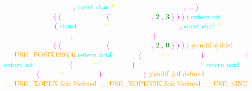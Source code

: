 \textcolor{white}{\_\_restrict} 
\textcolor{white}{\_\_obstack} 
\textcolor{magenta}{,} 
\textcolor{cyan}{const} 
\textcolor{cyan}{char} 
\textcolor{yellow}{*} 
\textcolor{white}{\_\_restrict} 
\textcolor{white}{\_\_format} 
\textcolor{magenta}{,} 
\textcolor{magenta}{...} 
\textcolor{magenta}{)} 
\textcolor{white}{\_\_THROWNL} 
\textcolor{white}{\_\_attribute\_\_} 
\textcolor{magenta}{(} 
\textcolor{magenta}{(} 
\textcolor{white}{\_\_format\_\_} 
\textcolor{magenta}{(} 
\textcolor{white}{\_\_printf\_\_} 
\textcolor{magenta}{,} 
\textcolor{green}{2} 
\textcolor{magenta}{,} 
\textcolor{green}{3} 
\textcolor{magenta}{)} 
\textcolor{magenta}{)} 
\textcolor{magenta}{)} 
\textcolor{magenta}{;} 
\textcolor{cyan}{extern} 
\textcolor{cyan}{int} 
\textcolor{white}{obstack\_vprintf} 
\textcolor{magenta}{(} 
\textcolor{cyan}{struct} 
\textcolor{white}{obstack} 
\textcolor{yellow}{*} 
\textcolor{white}{\_\_restrict} 
\textcolor{white}{\_\_obstack} 
\textcolor{magenta}{,} 
\textcolor{cyan}{const} 
\textcolor{cyan}{char} 
\textcolor{yellow}{*} 
\textcolor{white}{\_\_restrict} 
\textcolor{white}{\_\_format} 
\textcolor{magenta}{,} 
\textcolor{white}{\_\_gnuc\_va\_list} 
\textcolor{white}{\_\_args} 
\textcolor{magenta}{)} 
\textcolor{white}{\_\_THROWNL} 
\textcolor{white}{\_\_attribute\_\_} 
\textcolor{magenta}{(} 
\textcolor{magenta}{(} 
\textcolor{white}{\_\_format\_\_} 
\textcolor{magenta}{(} 
\textcolor{white}{\_\_printf\_\_} 
\textcolor{magenta}{,} 
\textcolor{green}{2} 
\textcolor{magenta}{,} 
\textcolor{green}{0} 
\textcolor{magenta}{)} 
\textcolor{magenta}{)} 
\textcolor{magenta}{)} 
\textcolor{magenta}{;} 
\textcolor{orange}{\#endif} 
\textcolor{orange}{\#ifdef \_\_USE\_POSIX199506} 
\textcolor{cyan}{extern} 
\textcolor{cyan}{void} 
\textcolor{white}{flockfile} 
\textcolor{magenta}{(} 
\textcolor{white}{FILE} 
\textcolor{yellow}{*} 
\textcolor{white}{\_\_stream} 
\textcolor{magenta}{)} 
\textcolor{white}{\_\_THROW} 
\textcolor{magenta}{;} 
\textcolor{cyan}{extern} 
\textcolor{cyan}{int} 
\textcolor{white}{ftrylockfile} 
\textcolor{magenta}{(} 
\textcolor{white}{FILE} 
\textcolor{yellow}{*} 
\textcolor{white}{\_\_stream} 
\textcolor{magenta}{)} 
\textcolor{white}{\_\_THROW} 
\textcolor{white}{\_\_wur} 
\textcolor{magenta}{;} 
\textcolor{cyan}{extern} 
\textcolor{cyan}{void} 
\textcolor{white}{funlockfile} 
\textcolor{magenta}{(} 
\textcolor{white}{FILE} 
\textcolor{yellow}{*} 
\textcolor{white}{\_\_stream} 
\textcolor{magenta}{)} 
\textcolor{white}{\_\_THROW} 
\textcolor{magenta}{;} 
\textcolor{orange}{\#endif} 
\textcolor{orange}{\#if defined \_\_USE\_XOPEN \&\& !defined \_\_USE\_XOPEN2K \&\& !defined \_\_USE\_GNU} 
